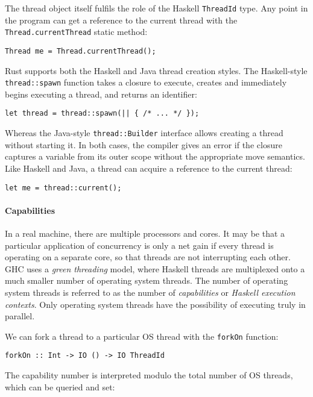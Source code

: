 The thread object itself fulfils the role of the Haskell
\verb|ThreadId| type.  Any point in the program can get a reference to
the current thread with the \verb|Thread.currentThread| static method:

\begin{verbatim}
Thread me = Thread.currentThread();
\end{verbatim}

Rust supports both the Haskell and Java thread creation styles.  The
Haskell-style \verb|thread::spawn| function takes a closure to
execute, creates and immediately begins executing a thread, and
returns an identifier:

\begin{verbatim}
let thread = thread::spawn(|| { /* ... */ });
\end{verbatim}

Whereas the Java-style \verb|thread::Builder| interface allows
creating a thread without starting it.  In both cases, the compiler
gives an error if the closure captures a variable from its outer scope
without the appropriate move semantics.  Like Haskell and Java, a
thread can acquire a reference to the current thread:

\begin{verbatim}
let me = thread::current();
\end{verbatim}

\paragraph{Capabilities}
In a real machine, there are multiple processors and cores.  It may be that a
particular application of concurrency is only a net gain if every thread is
operating on a separate core, so that threads are not interrupting each other.
GHC uses a \emph{green threading} model, where Haskell threads are multiplexed
onto a much smaller number of operating system threads.  The number of operating
system threads is referred to as the number of \emph{capabilities} or
\emph{Haskell execution contexts}.  Only operating system threads have the
possibility of executing truly in parallel.

We can fork a thread to a particular OS thread with the \verb|forkOn|
function:

\begin{verbatim}
forkOn :: Int -> IO () -> IO ThreadId
\end{verbatim}

The capability number is interpreted modulo the total number of OS
threads, which can be queried and set:

